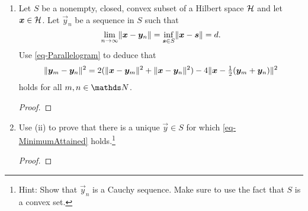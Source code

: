 \documentclass{../homework}
\begin{document}
\begin{Exercise}
\begin{enumerate}
    \begin{solution}
      \begin{proof}

      \end{proof}
    \end{solution}

  \item Let \(S\) be a nonempty, closed, convex subset of a Hilbert
    space \(\mathcal H\) and let \(\vec{x} \in \h\).  Let \(\vec{y}_n\) be a
    sequence in \(S\) such that
    \begin{equation}
      \label{eq-ParallelogramLimit}
      \lim_{n\to\infty} \norm{ \vec{x} - \vec{y}_n}
      = \inf_{ \vec{s} \in S} \norm{ \vec{x} - \vec{s}} = d.
    \end{equation}
    Use \eqref{eq-Parallelogram} to deduce that
    \begin{equation}
      \label{eq-Crazy}
      \norm{ \vec{y}_m - \vec{y}_n }^2
      = 2(\norm{ \vec{x} - \vec{y}_m }^2
      + \norm{ \vec{x} - \vec{y}_n}^2)
      - 4\norm{ \vec{x} - \tfrac{1}{2}( \vec{y}_m + \vec{y}_n) }^2
			\end{equation}
			holds for all \(m,n \in \N\).

      \begin{solution}
        \begin{proof}

        \end{proof}
      \end{solution}

		\item Use (ii) to prove that there is a unique \(\vec{y} \in S\)
      for which \eqref{eq-MinimumAttained} holds.\footnote{Hint: Show
        that \(\vec{y}_n\) is a Cauchy sequence.  Make sure to use the
        fact that \(S\) is a convex set.}

      \begin{solution}
        \begin{proof}

        \end{proof}
      \end{solution}


\end{enumerate}
\end{Exercise}
\end{document}
